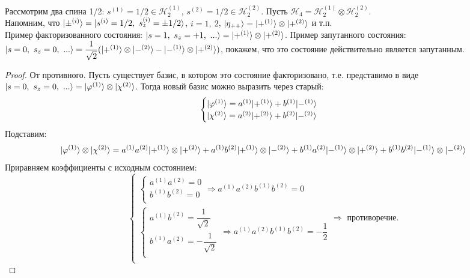 \begin{example}
	Рассмотрим два спина 1/2: $s^{(1)} = 1/2\in \mathcal{H}_2^{(1)}$, $s^{(2)} = 1/2\in \mathcal{H}_2^{(2)}$. Пусть $\mathcal{H}_4 = \mathcal{H}_2^{(1)}\otimes\mathcal{H}_2^{(2)}$.\\
	
	Напомним, что $| \pm^{(i)} \rangle = | s^{(i)}=1/2,~ s_z^{(i)} = \pm 1/2 \rangle$, $i =1,~2$, $| \eta_{++} \rangle = | +^{(1)} \rangle\otimes| +^{(2)} \rangle$ и т.п.\\
	
	Пример факторизованного состояния: $| s=1,~ s_z = +1,~... \rangle = | +^{(1)} \rangle\otimes| +^{(2)} \rangle$. Пример запутанного состояния: $| s=0,~ s_z = 0,~... \rangle = \dfrac{1}{\sqrt{2}}(| +^{(1)} \rangle\otimes| -^{(2)} \rangle-| -^{(1)} \rangle\otimes| +^{(2)} \rangle)$, покажем, что это состояние действительно является запутанным.
	\begin{proof}
		От противного. Пусть существует базис, в котором это состояние факторизовано, т.е. представимо в виде $| s=0,~s_z=0,~... \rangle = | \varphi^{(1)} \rangle\otimes| \chi^{(2)} \rangle$. Тогда новый базис можно выразить через старый:
		\[
		\begin{cases}
			| \varphi^{(1)} \rangle = a^{(1)}| +^{(1)} \rangle + b^{(1)}| -^{(1)} \rangle\\
			| \chi^{(2)} \rangle = a^{(2)}| +^{(2)} \rangle + b^{(2)}| -^{(2)} \rangle\\
		\end{cases}
		\]
		Подставим:
		\[
		| \varphi^{(1)} \rangle\otimes| \chi^{(2)} \rangle = a^{(1)}a^{(2)}| +^{(1)} \rangle\otimes| +^{(2)} \rangle + a^{(1)}b^{(2)}| +^{(1)} \rangle\otimes| -^{(2)} \rangle + b^{(1)}a^{(2)}| -^{(1)} \rangle\otimes| +^{(2)} \rangle + b^{(1)}b^{(2)}| -^{(1)} \rangle\otimes| -^{(2)} \rangle
		\]
		Приравняем коэффициенты с исходным состоянием:
		\[
		\begin{cases}
			\begin{cases}
				a^{(1)}a^{(2)} = 0\\
				b^{(1)}b^{(2)} = 0\\
			\end{cases} \Longrightarrow a^{(1)}a^{(2)}b^{(1)}b^{(2)} = 0\\
			\begin{cases}
				a^{(1)}b^{(2)} = \dfrac{1}{\sqrt{2}}\\
				b^{(1)}a^{(2)} = -\dfrac{1}{\sqrt{2}}\\
			\end{cases} \Longrightarrow a^{(1)}a^{(2)}b^{(1)}b^{(2)} = -\dfrac{1}{2}\\
		\end{cases} \Longrightarrow \text{ противоречие.}
		\]
	\end{proof}
\end{example}

